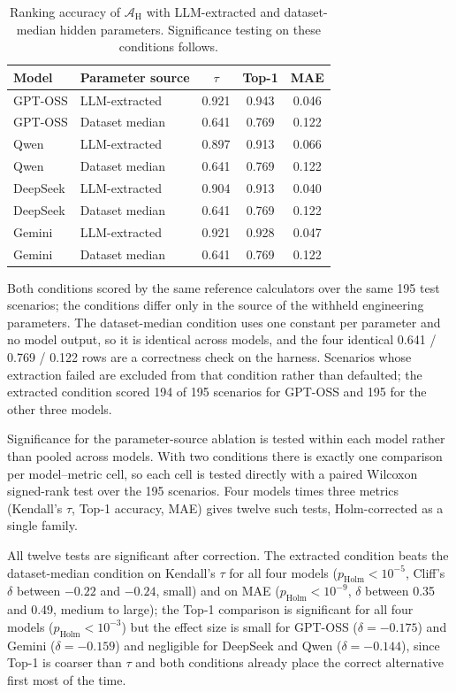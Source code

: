 \documentclass[11pt]{article}
\begin{document}
\begin{table}[htbp]
\centering
\footnotesize
\centering
\caption{Ranking accuracy of $\mathcal{A}_{\text{H}}$ with LLM-extracted and dataset-median hidden parameters. Significance testing on these conditions follows.}
\label{tab:param_provenance}
\renewcommand{\arraystretch}{1.15}
\begin{tabular}{llccc}
\toprule
Model & Parameter source & $\tau$ & Top-1 & MAE \\
\midrule
GPT-OSS & LLM-extracted & 0.921 & 0.943 & 0.046 \\
GPT-OSS & Dataset median & 0.641 & 0.769 & 0.122 \\
\midrule
Qwen & LLM-extracted & 0.897 & 0.913 & 0.066 \\
Qwen & Dataset median & 0.641 & 0.769 & 0.122 \\
\midrule
DeepSeek & LLM-extracted & 0.904 & 0.913 & 0.040 \\
DeepSeek & Dataset median & 0.641 & 0.769 & 0.122 \\
\midrule
Gemini & LLM-extracted & 0.921 & 0.928 & 0.047 \\
Gemini & Dataset median & 0.641 & 0.769 & 0.122 \\
\bottomrule
\end{tabular}
\renewcommand{\arraystretch}{1.0}
\end{table}

Both conditions scored by the same reference calculators over the same 195 test scenarios; the conditions differ only in the source of the withheld engineering parameters. The dataset-median condition uses one constant per parameter and no model output, so it is identical across models, and the four identical 0.641 / 0.769 / 0.122 rows are a correctness check on the harness. Scenarios whose extraction failed are excluded from that condition rather than defaulted; the extracted condition scored 194 of 195 scenarios for GPT-OSS and 195 for the other three models.

Significance for the parameter-source ablation is tested within each model rather than pooled across models. With two conditions there is exactly one comparison per model--metric cell, so each cell is tested directly with a paired Wilcoxon signed-rank test over the 195 scenarios. Four models times three metrics (Kendall's $\tau$, Top-1 accuracy, MAE) gives twelve such tests, Holm-corrected as a single family.

All twelve tests are significant after correction. The extracted condition beats the dataset-median condition on Kendall's $\tau$ for all four models ($p_{\text{Holm}} < 10^{-5}$, Cliff's $\delta$ between $-0.22$ and $-0.24$, small) and on MAE ($p_{\text{Holm}} < 10^{-9}$, $\delta$ between 0.35 and 0.49, medium to large); the Top-1 comparison is significant for all four models ($p_{\text{Holm}} < 10^{-3}$) but the effect size is small for GPT-OSS ($\delta=-0.175$) and Gemini ($\delta=-0.159$) and negligible for DeepSeek and Qwen ($\delta=-0.144$), since Top-1 is coarser than $\tau$ and both conditions already place the correct alternative first most of the time.
\end{document}
